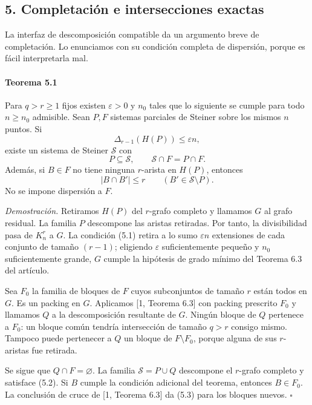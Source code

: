 \documentclass[spanish,11pt,a4paper]{article}
\begin{document}
\subsection{5. Completación e intersecciones exactas}\label{completaciuxf3n-e-intersecciones-exactas}

La interfaz de descomposición compatible da un argumento breve de completación. Lo enunciamos con su condición completa de dispersión, porque es fácil interpretarla mal.

\par
\begin{samepage}
\paragraph{Teorema 5.1}\label{teorema-5.1}

Para \(q>r\ge1\) fijos existen \(\varepsilon>0\) y \(n_0\) tales que lo siguiente se cumple para todo \(n\ge n_0\) admisible. Sean \(P,F\) sistemas parciales de Steiner sobre los mismos \(n\) puntos. Si \[\Delta_{r-1}(H(P))\le\varepsilon n,
\tag{5.1}\] existe un sistema de Steiner \(\mathcal S\) con \[P\subseteq\mathcal S,\qquad
\mathcal S\cap F=P\cap F.
\tag{5.2}\] Además, si \(B\in F\) no tiene ninguna \(r\)-arista en \(H(P)\), entonces \[|B\cap B'|\le r
\qquad(B'\in\mathcal S\setminus P).
\tag{5.3}\] No se impone dispersión a \(F\).

\end{samepage}
\emph{Demostración.} Retiramos \(H(P)\) del \(r\)-grafo completo y llamamos \(G\) al grafo residual. La familia \(P\) descompone las aristas retiradas. Por tanto, la divisibilidad pasa de \(K_n^r\) a \(G\). La condición (5.1) retira a lo sumo \(\varepsilon n\) extensiones de cada conjunto de tamaño \((r-1)\); eligiendo \(\varepsilon\) suficientemente pequeño y \(n_0\) suficientemente grande, \(G\) cumple la hipótesis de grado mínimo del Teorema 6.3 del artículo.

Sea \(F_0\) la familia de bloques de \(F\) cuyos subconjuntos de tamaño \(r\) están todos en \(G\). Es un packing en \(G\). Aplicamos {[}1, Teorema 6.3{]} con packing prescrito \(F_0\) y llamamos \(Q\) a la descomposición resultante de \(G\). Ningún bloque de \(Q\) pertenece a \(F_0\): un bloque común tendría intersección de tamaño \(q>r\) consigo mismo. Tampoco puede pertenecer a \(Q\) un bloque de \(F\setminus F_0\), porque alguna de sus \(r\)-aristas fue retirada.

Se sigue que \(Q\cap F=\varnothing\). La familia \(\mathcal S=P\cup Q\) descompone el \(r\)-grafo completo y satisface (5.2). Si \(B\) cumple la condición adicional del teorema, entonces \(B\in F_0\). La conclusión de cruce de {[}1, Teorema 6.3{]} da (5.3) para los bloques nuevos. \(\square\)
\end{document}

